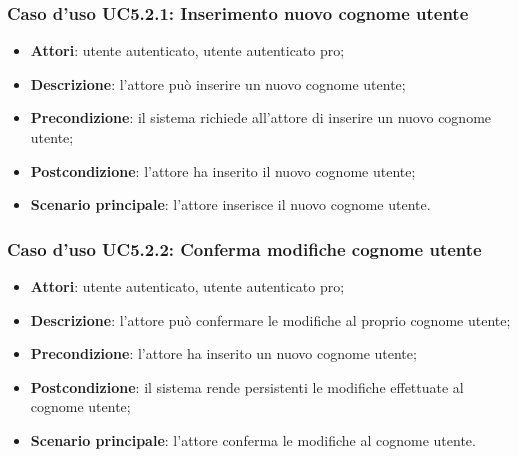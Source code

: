 \subsubsection{Caso d'uso UC5.2.1: Inserimento nuovo cognome utente}

\begin{itemize}
	\item \textbf{Attori}: utente autenticato, utente autenticato pro;
	\item \textbf{Descrizione}: l'attore può inserire un nuovo cognome utente;
	\item \textbf{Precondizione}:  il sistema richiede all'attore di inserire un nuovo cognome utente;
	\item \textbf{Postcondizione}:  l'attore ha inserito il nuovo cognome utente;
	\item \textbf{Scenario principale}: l'attore inserisce il nuovo cognome utente.
\end{itemize}

\subsubsection{Caso d'uso UC5.2.2: Conferma modifiche cognome utente}

\begin{itemize}
	\item \textbf{Attori}: utente autenticato, utente autenticato pro;
	\item \textbf{Descrizione}: l'attore può confermare le modifiche al proprio cognome utente;
	\item \textbf{Precondizione}: l'attore ha inserito un nuovo cognome utente;
	\item \textbf{Postcondizione}: il sistema rende persistenti le modifiche effettuate al cognome utente;
	\item \textbf{Scenario principale}: l'attore conferma le modifiche al cognome utente.
\end{itemize}

